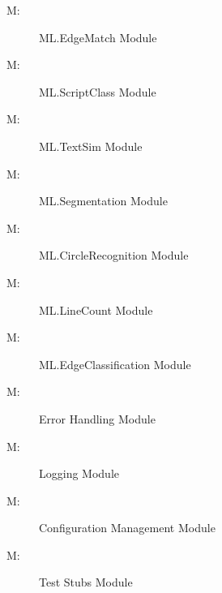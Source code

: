 \documentclass[12pt, titlepage]{article}
\newcounter{mnum}
\newcommand{\mthemnum}{M\themnum}
\begin{document}
\begin{description}
\item [ \mthemnum \label{mEdgeMatch}:] ML.EdgeMatch Module
\item [ \mthemnum \label{mScriptClass}:] ML.ScriptClass Module
\item [ \mthemnum \label{mTextSim}:] ML.TextSim Module
\item [ \mthemnum \label{mSegmentation}:] ML.Segmentation Module
\item [ \mthemnum \label{mCircleRecognition}:] ML.CircleRecognition Module
\item [ \mthemnum \label{mLineCount}:] ML.LineCount Module
\item [ \mthemnum \label{mEdgeClassification}:] ML.EdgeClassification Module
\item [ \mthemnum \label{mError}:] Error Handling Module
\item [ \mthemnum \label{mLogging}:] Logging Module
\item [ \mthemnum \label{mConfig}:] Configuration Management Module
\item [ \mthemnum \label{mTestStubs}:] Test Stubs Module
\end{description}
\end{document}

